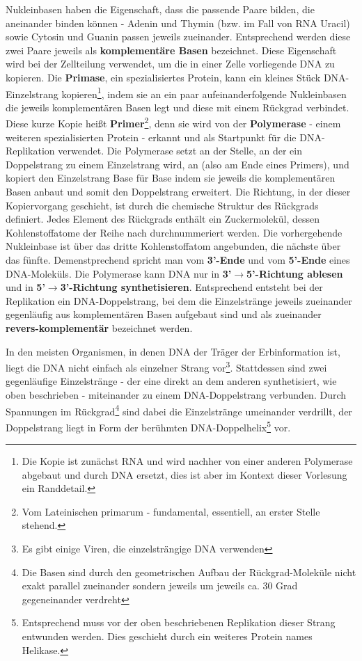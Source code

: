   Nukleinbasen haben die Eigenschaft, dass die passende Paare bilden, die aneinander binden können - Adenin und Thymin (bzw. im Fall von RNA Uracil) sowie Cytosin und Guanin passen jeweils zueinander. Entsprechend werden diese zwei Paare jeweils als \textbf{komplementäre Basen} bezeichnet. Diese Eigenschaft wird bei der Zellteilung verwendet, um die in einer Zelle vorliegende DNA zu kopieren. Die \textbf{Primase}, ein spezialisiertes Protein, kann ein kleines Stück DNA-Einzelstrang kopieren\footnote{Die Kopie ist zunächst RNA und wird nachher von einer anderen Polymerase abgebaut und durch DNA ersetzt, dies ist aber im Kontext dieser Vorlesung ein Randdetail.}, indem sie an ein paar aufeinanderfolgende Nukleinbasen die jeweils komplementären Basen legt und diese mit einem Rückgrad verbindet. Diese kurze Kopie heißt \textbf{Primer}\footnote{Vom Lateinischen primarum - fundamental, essentiell, an erster Stelle stehend.}, denn sie wird von der \textbf{Polymerase} - einem weiteren spezialisierten Protein - erkannt und als Startpunkt für die DNA-Replikation verwendet. Die Polymerase setzt an der Stelle, an der ein Doppelstrang zu einem Einzelstrang wird, an (also am Ende eines Primers), und kopiert den Einzelstrang Base für Base indem sie jeweils die komplementären Basen anbaut und somit den Doppelstrang erweitert. Die Richtung, in der dieser Kopiervorgang geschieht, ist durch die chemische Struktur des Rückgrads definiert. Jedes Element des Rückgrads enthält ein Zuckermolekül, dessen Kohlenstoffatome der Reihe nach durchnummeriert werden. Die vorhergehende Nukleinbase ist über das dritte Kohlenstoffatom angebunden, die nächste über das fünfte. Demenstprechend spricht man vom \textbf{3'-Ende} und vom \textbf{5'-Ende} eines DNA-Moleküls. Die Polymerase kann DNA nur in \textbf{3'$\rightarrow$5'-Richtung ablesen} und in \textbf{5'$\rightarrow$3'-Richtung synthetisieren}. Entsprechend entsteht bei der Replikation ein DNA-Doppelstrang, bei dem die Einzelstränge jeweils zueinander gegenläufig aus komplementären Basen aufgebaut sind und als zueinander \textbf{revers-komplementär} bezeichnet werden.

  In den meisten Organismen, in denen DNA der Träger der Erbinformation ist, liegt die DNA nicht einfach als einzelner Strang vor\footnote{Es gibt einige Viren, die einzelsträngige DNA verwenden}. Stattdessen sind zwei gegenläufige Einzelstränge - der eine direkt an dem anderen synthetisiert, wie oben beschrieben - miteinander zu einem DNA-Doppelstrang verbunden. Durch Spannungen im Rückgrad\footnote{Die Basen sind durch den geometrischen Aufbau der Rückgrad-Moleküle nicht exakt parallel zueinander sondern jeweils um jeweils ca. 30 Grad gegeneinander verdreht} sind dabei die Einzelstränge umeinander verdrillt, der Doppelstrang liegt in Form der berühmten DNA-Doppelhelix\footnote{Entsprechend muss vor der oben beschriebenen Replikation dieser Strang entwunden werden. Dies geschieht durch ein weiteres Protein names Helikase.} vor. 

